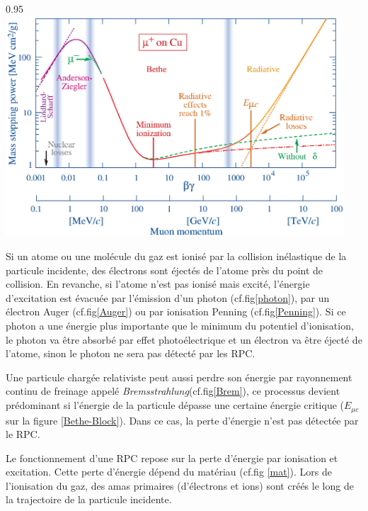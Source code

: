 \begin{minipagewithmarginpars}[h]{0.95\textwidth}
	\centering
	\includegraphics[width=0.95\textwidth]{RPC/Bethe-Bloch.eps}
	\label{Bethe-Block}
\end{minipagewithmarginpars}

Si un atome ou une molécule du gaz est ionisé par la collision inélastique de la particule incidente, des électrons sont éjectés de l'atome près du point de collision. En revanche, si l'atome n'est pas ionisé mais excité, l'énergie d'excitation est évacuée par l'émission d'un photon (cf.fig\ref{photon}), par un électron Auger (cf.fig\ref{Auger}) ou par ionisation Penning (cf.fig\ref{Penning}). Si ce photon a une énergie plus importante que le minimum du potentiel d'ionisation, le photon va être absorbé par effet photoélectrique et un électron va être éjecté de l'atome, sinon le photon ne sera pas détecté par les RPC.

Une particule chargée relativiste peut aussi perdre son énergie par rayonnement continu de freinage appelé \textit{Bremsstrahlung}(cf.fig\ref{Brem}), ce processus devient prédominant si l'énergie de la particule dépasse une certaine énergie critique ($E_{\mu c}$ sur la figure \ref{Bethe-Block}). Dans ce cas, la perte d'énergie n'est pas détectée par le RPC.

Le fonctionnement d'une RPC repose sur la perte d'énergie par ionisation et excitation. Cette perte d'énergie dépend du matériau (cf.fig \ref{mat}). Lors de l'ionisation du gaz, des amas primaires (d'électrons et ions) sont créés le long de la trajectoire de la particule incidente. 


